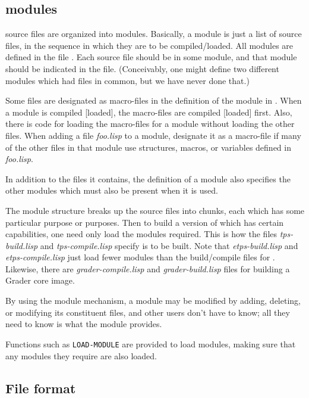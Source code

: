 \subsection{\TPS modules}

\TPS source files are organized into \TPS modules. 
Basically, a \TPS module is just a list of source files, in the
sequence in which they are to be compiled/loaded.  All
\TPS modules are defined in the file {\it {}}.  Each source
file should be in some \TPS module, and that module should be indicated
in the file.  
(Conceivably, one might define two
different \TPS modules which had files in common, but we have never
done that.)  

Some files are designated as macro-files in the definition of the module
in {\it {}}.  
When a module is
compiled [loaded], the macro-files are compiled [loaded] first.
Also, there is code for loading the macro-files for a module without loading the
other files.  
When adding a file {\it foo.lisp} to a module,
designate it as a macro-file
if many of the other
files in that module use structures, macros, or variables defined in {\it foo.lisp}.

In addition to the files it contains, the definition of a \TPS module
also specifies the other modules which must also be present when it
is used.  

The \TPS module structure breaks up the source files into chunks,
each which has some particular purpose or purposes.  Then to build a
version of \TPS which has certain capabilities, one need
only load the modules required.  This is how the files
{\it tps-build.lisp} and {\it tps-compile.lisp} specify \TPS is to be
built. Note that {\it etps-build.lisp} and {\it etps-compile.lisp} just
load fewer modules than the build/compile files for \tps.  Likewise,
there are {\it grader-compile.lisp} and {\it grader-build.lisp} files for
building a Grader core image.

By using the module mechanism, a module may be modified by
adding, deleting, or modifying its constituent files, and other users don't
have to know; all they need to know is what the module provides.

Functions such as {\tt LOAD-MODULE}
are provided to load modules, making sure that any modules they
require are also loaded.

\subsection{File format}

